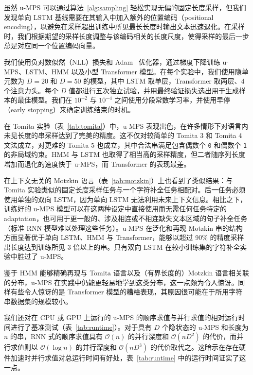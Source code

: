 \documentclass[twoside]{article}
\begin{document}
虽然 u-MPS 可以通过算法~\ref{alg:sampling} 轻松实现无偏的固定长度采样，但我们发现单向 LSTM 基线需要在其输入中加入额外的位置编码（positional encoding），以避免在采样超出训练中所见最长长度时输出文本迅速退化。在采样时，我们根据期望的采样长度调整与该编码相关的长度尺度，使得采样的最后一步总是对应同一个位置编码向量。

我们使用负对数似然（NLL）损失和 Adam~\citep{kingma2015} 优化器，通过梯度下降训练 u-MPS、LSTM、HMM 以及小型 Transformer 模型。在每个实验中，我们使用隐单元数为 $D=20$ 和 $D=50$ 的模型，其中 LSTM 取单层，Transformer 取两层、4 个注意力头。每个 $D$ 值都进行五次独立试验，并用最终验证损失选出用于生成样本的最佳模型。我们在 $10^{-2}$ 与 $10^{-4}$ 之间使用分段常数学习率，并使用早停（early stopping）来确定训练结束的时机。

在 Tomita 实验（表~\ref{tab:tomita}）中，u-MPS 表现出色，在许多情形下对语言内未见长度的串采样达到了完美的精度。这不仅对较简单的 Tomita 3 和 Tomita 4 文法成立，对更难的 Tomita 5 也成立，其中合法串满足包含偶数个 \texttt{0} 和偶数个 \texttt{1} 的非局域约束。HMM 与 LSTM 也取得了相当高的采样精度，但二者随序列长度增加而退化的速度快于 u-MPS，而 Transformer 的表现最差。

在上下文无关的 Motzkin 语言（表~\ref{tab:motzkin}）上也看到了类似结果：与 Tomita 实验类似的固定长度采样任务与一个字符补全任务相配对。后一任务必须使用单独的双向 LSTM，因为单向 LSTM 无法利用未来上下文信息。相比之下，训练好的 u-MPS 模型可以在这两种设定中直接使用而无需任何任务特定的 adaptation，也可用于更一般的、涉及相连或不相连缺失文本区域的句子补全任务（标准 RNN 模型难以处理这些任务）。u-MPS 在泛化和再现 Motzkin 串的结构方面显著优于单向 LSTM、HMM 与 Transformer，能够以超过 90\% 的精度采样出长度达到训练所见 3 倍以上的串。只有双向 LSTM 在较小训练集的字符补全实验中胜过了 u-MPS。

鉴于 HMM 能够精确再现与 Tomita 语言以及（有界长度的）Motzkin 语言相关联的分布，u-MPS 在实践中仍能更轻易地学到这类分布，这一点颇为令人惊讶。同样有些令人惊讶的是 Transformer 模型的糟糕表现，其原因很可能在于所用字符串数据集的规模较小。

我们还对在 CPU 或 GPU 上运行的 u-MPS 的顺序求值与并行求值的相对运行时间进行了基准测试（表~\ref{tab:runtime}）。对于具有 $D$ 个隐状态的 u-MPS 和长度为 $n$ 的串，RNN 式的顺序求值具有 $\mathcal{O}(n)$ 的并行深度和 $\mathcal{O}(nD^2)$ 的代价，而并行求值则以 $\mathcal{O}(\log n)$ 的并行深度和 $\mathcal{O}(nD^3)$ 的代价取代之。这暗示在存在硬件加速时并行求值对总运行时间有好处，表~\ref{tab:runtime} 中的运行时间证实了这一点。
\end{document}

